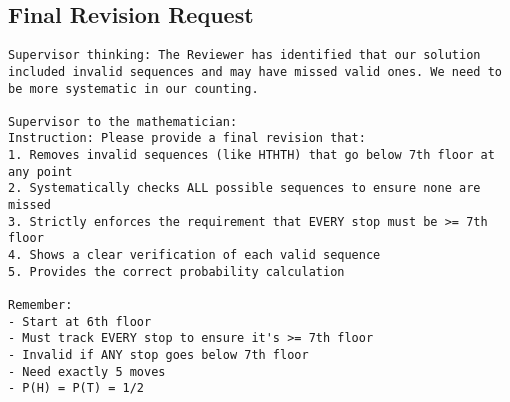 \subsection{Final Revision Request}
\vspace{-0.5em}
\begin{supervisorbox}
\begin{lstlisting}
Supervisor thinking: The Reviewer has identified that our solution included invalid sequences and may have missed valid ones. We need to be more systematic in our counting.

Supervisor to the mathematician:
Instruction: Please provide a final revision that:
1. Removes invalid sequences (like HTHTH) that go below 7th floor at any point
2. Systematically checks ALL possible sequences to ensure none are missed
3. Strictly enforces the requirement that EVERY stop must be >= 7th floor
4. Shows a clear verification of each valid sequence
5. Provides the correct probability calculation

Remember:
- Start at 6th floor
- Must track EVERY stop to ensure it's >= 7th floor
- Invalid if ANY stop goes below 7th floor
- Need exactly 5 moves
- P(H) = P(T) = 1/2

\end{lstlisting}
\end{supervisorbox}

